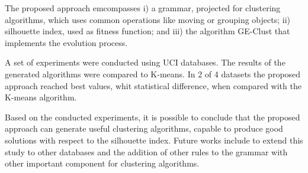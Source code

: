 \documentclass[conference,compsoc]{IEEEtran}
\begin{document}
The proposed approach emcompasses i) a grammar,  projected for clustering algorithms, which uses common operations like moving or grouping objects; ii)  silhouette index, used as fitness function; and iii) the algorithm GE-Clust that implements the evolution process. 

A set of experiments were conducted using UCI databases. The results of the generated algorithms were compared to K-means. In 2 of 4 datasets the proposed approach reached best values, whit statistical difference, when compared with the K-means algorithm.

Based on the conducted experiments, it is possible to conclude that the proposed approach can generate useful clustering algorithms, capable to produce good solutions with respect to the silhouette index. Future works include to extend this study to other databases and the addition of other rules to the grammar with other important component for clustering algorithms.








\end{document}
